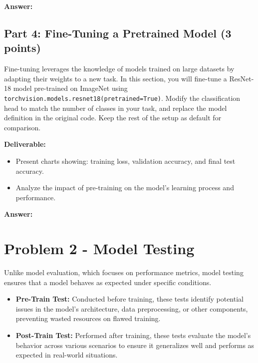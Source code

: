 \documentclass[11pt, oneside]{article}   	%
\begin{document}
\begin{answerbox} \textbf{Answer:} \vspace*{1cm}

\end{answerbox}

\subsection*{Part 4: Fine-Tuning a Pretrained Model (3 points)}
Fine-tuning leverages the knowledge of models trained on large datasets by adapting their weights to a new task. In this section, you will fine-tune a ResNet-18 model pre-trained on ImageNet using \texttt{torchvision.models.resnet18(pretrained=True)}. Modify the classification head to match the number of classes in your task, and replace the model definition in the original code. Keep the rest of the setup as default for comparison.


\noindent\textbf{Deliverable:}
\begin{itemize}
    \item Present charts showing: training loss, validation accuracy, and final test accuracy.
    \item Analyze the impact of pre-training on the model's learning process and performance.
    
\end{itemize}

\begin{answerbox} \textbf{Answer:} \vspace*{1cm}

\end{answerbox}


\clearpage

\section*{Problem 2 - Model Testing}
Unlike model evaluation, which focuses on performance metrics, model testing ensures that a model behaves as expected under specific conditions.

\begin{itemize}
    \item \textbf{Pre-Train Test:} Conducted before training, these tests identify potential issues in the model's architecture, data preprocessing, or other components, preventing wasted resources on flawed training.
    \item \textbf{Post-Train Test:} Performed after training, these tests evaluate the model's behavior across various scenarios to ensure it generalizes well and performs as expected in real-world situations.
    
\end{itemize}
\end{document}
